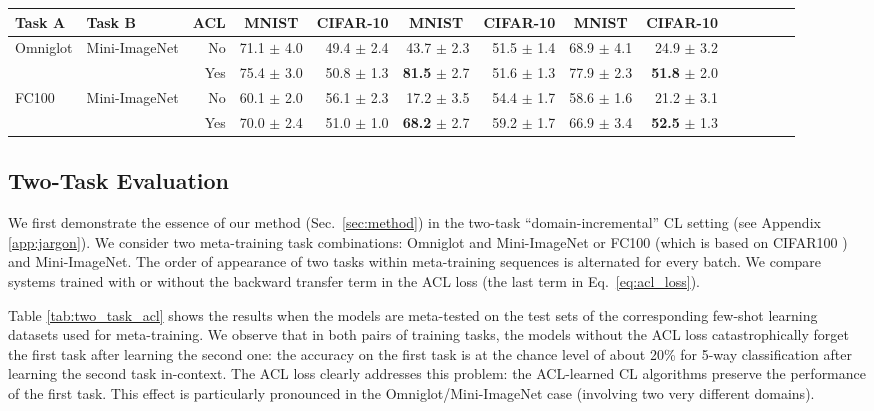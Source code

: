 \documentclass{article}
\begin{document}
\begin{table}[t]
\begin{center}
\begin{tabular}{llrrrrrrrrrrrr}
  Task A & Task B & \multicolumn{1}{c}{ACL}  & \multicolumn{1}{c}{MNIST}  & \multicolumn{1}{c}{CIFAR-10} & \multicolumn{1}{c}{MNIST} & \multicolumn{1}{c}{CIFAR-10}  & \multicolumn{1}{c}{MNIST} & \multicolumn{1}{c}{CIFAR-10} \\ \midrule
 Omniglot & Mini-ImageNet & No & 71.1 $\pm$ 4.0 & 49.4 $\pm$ 2.4 & 43.7 $\pm$ 2.3 & 51.5 $\pm$ 1.4 & 68.9  $\pm$ 4.1 & 24.9 $\pm$ 3.2    \\ %
 & & Yes & 75.4 $\pm$ 3.0 & 50.8 $\pm$ 1.3 & \textbf{81.5} $\pm$ 2.7 & 51.6  $\pm$ 1.3 & 77.9 $\pm$ 2.3 & \textbf{51.8} $\pm$ 2.0  \\  \midrule 
 FC100 & Mini-ImageNet   & No & 60.1 $\pm$ 2.0 & 56.1 $\pm$ 2.3 & 17.2 $\pm$ 3.5 & 54.4 $\pm$ 1.7 & 58.6 $\pm$ 1.6 & 21.2 $\pm$ 3.1 \\
 & & Yes & 70.0 $\pm$ 2.4 & 51.0 $\pm$ 1.0 & \textbf{68.2} $\pm$ 2.7 & 59.2 $\pm$ 1.7 & 66.9 $\pm$ 3.4 & \textbf{52.5} $\pm$ 1.3  \\
\bottomrule
\end{tabular}

\end{center}
\vspace{-3mm}
\end{table}


\subsection{Two-Task Evaluation}
\label{sec:exp_two_task}
\vspace{-2mm}
We first demonstrate the essence of our method (Sec.~\ref{sec:method}) in the two-task ``domain-incremental'' CL setting (see Appendix \ref{app:jargon}).
We consider two meta-training task combinations: Omniglot \citep{lake2015human} and Mini-ImageNet \citep{VinyalsBLKW16, RaviL17} or FC100 \citep{OreshkinLL18} (which is based on  CIFAR100 \citep{krizhevsky}) and Mini-ImageNet.
The order of appearance of two tasks within meta-training sequences is alternated for every batch.
We compare systems trained with or without the backward transfer term in the ACL loss (the last term in Eq.~\ref{eq:acl_loss}).

Table \ref{tab:two_task_acl} shows the results when the models are meta-tested on the test sets of the corresponding few-shot learning datasets used for meta-training.
We observe that in both pairs of training tasks, the models without the ACL loss catastrophically forget the first task after learning the second one: the accuracy on the first task is at the chance level of about 20\% for 5-way classification after learning the second task in-context.
The ACL loss clearly addresses this problem: the ACL-learned CL algorithms preserve the performance of the first task.
This effect is particularly pronounced in the Omniglot/Mini-ImageNet case (involving two very different domains).
\end{document}
